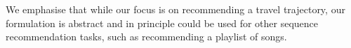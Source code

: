 \begin{itemize}[noitemsep,leftmargin=12pt]
\end{itemize}

We emphasise that while
our focus is
on recommending a travel trajectory, our formulation is abstract and in principle could be
used for other sequence recommendation tasks, such as recommending a playlist of songs.





